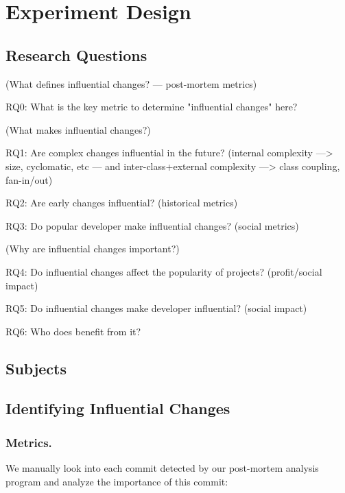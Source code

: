 \section{Experiment Design}
\label{sec:experiment}

\subsection{Research Questions}
\label{sec:questions}

(What defines influential changes? --- post-mortem metrics)

RQ0: What is the key metric to determine "influential changes" here?

(What makes influential changes?)

RQ1: Are complex changes influential in the future? (internal complexity 
---> size, cyclomatic, etc --- and inter-class+external complexity ---> class coupling, fan-in/out)

RQ2: Are early changes influential? (historical metrics)

RQ3: Do popular developer make influential changes? (social metrics)

(Why are influential changes important?)

RQ4: Do influential changes affect the popularity of projects? (profit/social impact)

RQ5: Do influential changes make developer influential? (social impact)

RQ6: Who does benefit from it?






\subsection{Subjects}




\subsection{Identifying Influential Changes}

\subsubsection{Metrics.}
\label{sec:metrics}
We manually look into each commit detected by our post-mortem analysis program
and analyze the importance of this commit:

